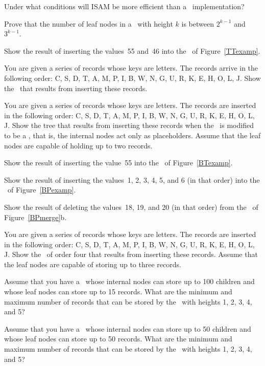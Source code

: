 \begin{exercises}
\item
Under what conditions will ISAM
be more efficient than a \BPtree\ implementation?

\item
Prove that the number of leaf nodes in a \TTtree\ with height \(k\) is
between \(2^{k-1}\) and \(3^{k-1}\).

\item
Show the result of inserting the values~55 and~46 into the \TTtree\ of
Figure~\ref{TTexamp}.

\item
You are given a series of records whose keys are letters.
The records arrive in the following order:
C, S, D, T, A, M, P, I, B, W, N, G, U, R, K, E, H, O, L, J.
Show the \TTtree\ that results from inserting these
records.

\item
You are given a series of records whose keys are letters.
The records are inserted in the following order:
C, S, D, T, A, M, P, I, B, W, N, G, U, R, K, E, H, O, L, J.
Show the tree that results from inserting these records when the
\TTtree\ is modified to be a \TTPtree, that is, the internal nodes
act only as placeholders.
Assume that the leaf nodes are capable of holding up to two records.

\item
Show the result of inserting the value~55 into the \Btree\ of
Figure~\ref{BTexamp}.

\item
Show the result of inserting the values~1, 2, 3, 4, 5, and 6 (in that
order) into the \BPtree\ of
Figure~\ref{BPexamp}.


\item
Show the result of deleting the values~18, 19, and 20 (in that
order) from the \BPtree\ of
Figure~\ref{BPmerge}b.

\item
You are given a series of records whose keys are letters.
The records are inserted in the following order:
C, S, D, T, A, M, P, I, B, W, N, G, U, R, K, E, H, O, L, J.
Show the \BPtree\ of order four that results from inserting these
records.
Assume that the leaf nodes are capable of storing up to three records.

\item
Assume that you have a \BPtree\ whose
internal
nodes can store up to 100 children and whose leaf nodes can store up
to 15 records.
What are the minimum and maximum number of records that can be stored
by the \BPtree\ with heights 1, 2, 3, 4, and 5?

\item
Assume that you have a \BPtree\ whose
internal nodes can store up to
50 children and whose leaf nodes can store up to 50 records.
What are the minimum and maximum number of records that can be stored
by the \BPtree\ with heights 1, 2, 3, 4, and 5?
\end{exercises}

